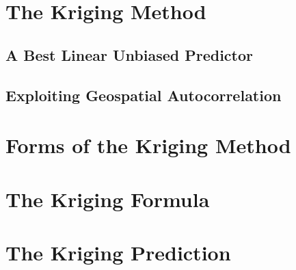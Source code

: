 \documentclass[11pt]{ucthesis}
\begin{document}
\section{The Kriging Method}
\subsection{A Best Linear Unbiased Predictor}
\subsection{Exploiting Geospatial Autocorrelation}
\section{Forms of the Kriging Method}
\section{The Kriging Formula}
\section{The Kriging Prediction}
\end{document}
